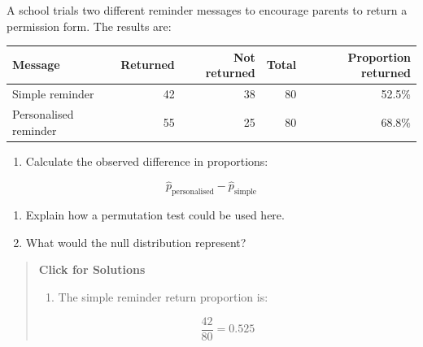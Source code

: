 \documentclass[
  letterpaper,
  DIV=11,
  numbers=noendperiod]{scrreprt}
\providecommand{\tightlist}{%
  \setlength{\itemsep}{0pt}\setlength{\parskip}{0pt}}
\begin{document}
\begin{tcolorbox}[enhanced jigsaw, arc=.35mm, bottomrule=.15mm, bottomtitle=1mm, breakable, colback=white, colbacktitle=quarto-callout-note-color!10!white, colframe=quarto-callout-note-color-frame, coltitle=black, left=2mm, leftrule=.75mm, opacityback=0, opacitybacktitle=0.6, rightrule=.15mm, title=\textcolor{quarto-callout-note-color}{\faInfo}\hspace{0.5em}{Question 3}, titlerule=0mm, toprule=.15mm, toptitle=1mm]

A school trials two different reminder messages to encourage parents to
return a permission form. The results are:

\begin{table}
\fontsize{12.0pt}{14.0pt}\selectfont
\begin{tabular*}{\linewidth}{@{\extracolsep{\fill}}lrrrr}
\toprule
Message & Returned & Not returned & Total & Proportion returned \\ 
\midrule\addlinespace[2.5pt]
Simple reminder & 42 & 38 & 80 & 52.5\% \\ 
Personalised reminder & 55 & 25 & 80 & 68.8\% \\ 
\bottomrule
\end{tabular*}
\end{table}

\begin{enumerate}
\def\labelenumi{(\alph{enumi})}
\tightlist
\item
  Calculate the observed difference in proportions:
\end{enumerate}

\[\hat{p}_{\text{personalised}} - \hat{p}_{\text{simple}}\]

\begin{enumerate}
\def\labelenumi{(\alph{enumi})}
\setcounter{enumi}{1}
\item
  Explain how a permutation test could be used here.
\item
  What would the null distribution represent?
\end{enumerate}

\begin{quote}
\textbf{Click for Solutions}

\begin{enumerate}
\def\labelenumi{(\alph{enumi})}
\tightlist
\item
  The simple reminder return proportion is:
\end{enumerate}

\[\frac{42}{80} = 0.525\]


\end{quote}
\end{tcolorbox}
\end{document}

